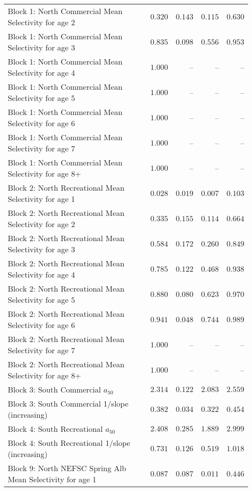 \documentclass[
]{article}
\begin{document}
\begin{landscape}
\begin{longtable}[t]{lrrrr}
Block 1: North Commercial Mean Selectivity for age 2 & $0.320$ & $0.143$ & $0.115$ & $0.630$\\
Block 1: North Commercial Mean Selectivity for age 3 & $0.835$ & $0.098$ & $0.556$ & $0.953$\\
Block 1: North Commercial Mean Selectivity for age 4 & $1.000$ & -- & -- & --\\
Block 1: North Commercial Mean Selectivity for age 5 & $1.000$ & -- & -- & --\\
\addlinespace
Block 1: North Commercial Mean Selectivity for age 6 & $1.000$ & -- & -- & --\\
Block 1: North Commercial Mean Selectivity for age 7 & $1.000$ & -- & -- & --\\
Block 1: North Commercial Mean Selectivity for age 8+ & $1.000$ & -- & -- & --\\
Block 2: North Recreational Mean Selectivity for age 1 & $0.028$ & $0.019$ & $0.007$ & $0.103$\\
Block 2: North Recreational Mean Selectivity for age 2 & $0.335$ & $0.155$ & $0.114$ & $0.664$\\
\addlinespace
Block 2: North Recreational Mean Selectivity for age 3 & $0.584$ & $0.172$ & $0.260$ & $0.849$\\
Block 2: North Recreational Mean Selectivity for age 4 & $0.785$ & $0.122$ & $0.468$ & $0.938$\\
Block 2: North Recreational Mean Selectivity for age 5 & $0.880$ & $0.080$ & $0.623$ & $0.970$\\
Block 2: North Recreational Mean Selectivity for age 6 & $0.941$ & $0.048$ & $0.744$ & $0.989$\\
Block 2: North Recreational Mean Selectivity for age 7 & $1.000$ & -- & -- & --\\
\addlinespace
Block 2: North Recreational Mean Selectivity for age 8+ & $1.000$ & -- & -- & --\\
Block 3: South Commercial $a_{50}$ & $2.314$ & $0.122$ & $2.083$ & $2.559$\\
Block 3: South Commercial 1/slope (increasing) & $0.382$ & $0.034$ & $0.322$ & $0.454$\\
Block 4: South Recreational $a_{50}$ & $2.408$ & $0.285$ & $1.889$ & $2.999$\\
Block 4: South Recreational 1/slope (increasing) & $0.731$ & $0.126$ & $0.519$ & $1.018$\\
\addlinespace
Block 9: North NEFSC Spring Alb Mean Selectivity for age 1 & $0.087$ & $0.087$ & $0.011$ & $0.446$\\

\end{longtable}
\end{landscape}
\end{document}
